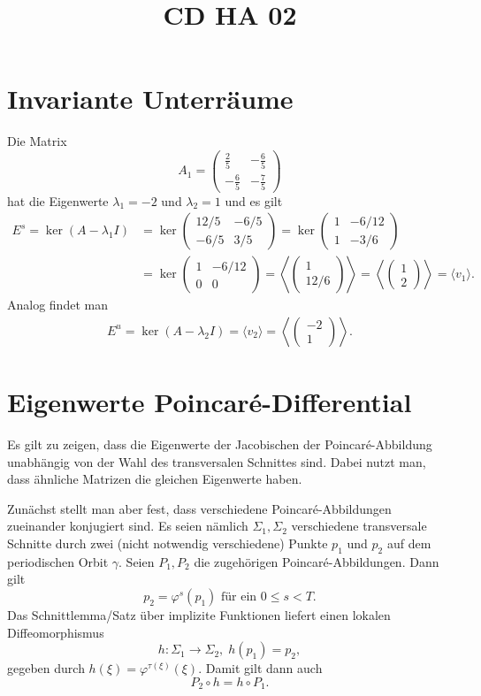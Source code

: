 \documentclass[a4paper]{article}
\title{CD HA 02}
\begin{document}
\section{Invariante Unterräume}
Die Matrix
$$A_1 = \begin{pmatrix}
\frac{2}{5} & -\frac{6}{5} \\
-\frac{6}{5} & -\frac{7}{5}
\end{pmatrix}$$
hat die Eigenwerte $λ_1 = -2$ und $λ_2 = 1$ und es gilt
\begin{align*}
E^s = \ker (A - λ_1 I) &= \ker \begin{pmatrix}
12/5 & -6/5 \\ -6/5 & 3/5
\end{pmatrix} = \ker \begin{pmatrix}
1 & -6/12 \\ 1 & -3/6
\end{pmatrix}\\
&=\ker\begin{pmatrix}
1 & -6/12\\
0 & 0
\end{pmatrix} = \left\langle \begin{pmatrix}
1 \\ 12/6
\end{pmatrix} \right\rangle  
= \left\langle \begin{pmatrix}
1 \\ 2
\end{pmatrix} \right\rangle = \langle v_1 \rangle.
\end{align*}
Analog findet man
\begin{align*}
E^u = \ker (A -λ_2 I) = \langle v_2 \rangle = \left\langle \begin{pmatrix}
-2\\ 1
\end{pmatrix}\right\rangle.
\end{align*}


\section{Eigenwerte Poincaré-Differential}
Es gilt zu zeigen, dass die Eigenwerte der Jacobischen der Poincaré-Abbildung unabhängig von der Wahl des transversalen Schnittes sind. 
Dabei nutzt man, dass ähnliche Matrizen die gleichen Eigenwerte haben.

Zunächst stellt man aber fest, dass verschiedene Poincaré-Abbildungen zueinander konjugiert sind. 
Es seien nämlich $Σ_1, Σ_2$ verschiedene transversale Schnitte durch zwei (nicht notwendig verschiedene) Punkte $p_1$ und $p_2$ auf dem periodischen Orbit $γ$. 
Seien $P_1, P_2$ die zugehörigen Poincaré-Abbildungen.
Dann gilt
$$p_2 = φ^s (p_1) \text{ für ein $0\le s < T$.}$$
Das Schnittlemma/Satz über implizite Funktionen liefert einen lokalen Diffeomorphismus
$$h\colon Σ_1 \to Σ_2, \; h(p_1) = p_2,$$
gegeben durch $h(ξ) = φ^{τ(ξ)} (ξ)$.
Damit gilt dann auch
$$P_2 \circ h = h\circ P_1.$$
\end{document}

